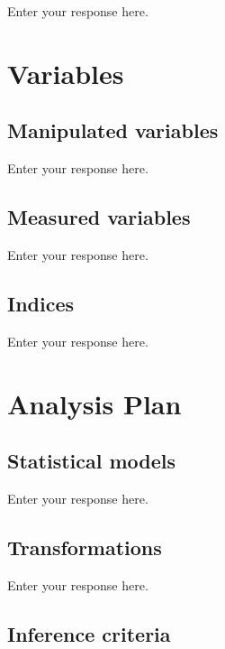 \documentclass[]{article}
\begin{document}
Enter your response here.

\hypertarget{variables}{%
\section{Variables}\label{variables}}

\hypertarget{manipulated-variables}{%
\subsection{Manipulated variables}\label{manipulated-variables}}

Enter your response here.

\hypertarget{measured-variables}{%
\subsection{Measured variables}\label{measured-variables}}

Enter your response here.

\hypertarget{indices}{%
\subsection{Indices}\label{indices}}

Enter your response here.

\hypertarget{analysis-plan}{%
\section{Analysis Plan}\label{analysis-plan}}

\hypertarget{statistical-models}{%
\subsection{Statistical models}\label{statistical-models}}

Enter your response here.

\hypertarget{transformations}{%
\subsection{Transformations}\label{transformations}}

Enter your response here.

\hypertarget{inference-criteria}{%
\subsection{Inference criteria}\label{inference-criteria}}
\end{document}
